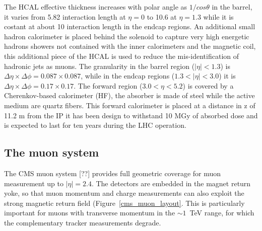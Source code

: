 The HCAL effective thickness increases with polar angle as $1/cos\theta$ in the barrel, 
it varies from 5.82 interaction length at $\eta = 0$ to 10.6 at $\eta = 1.3$ while it is
costant at about 10 interaction length in the endcap regions.
An additional  small hadron
calorimeter is placed behind the solenoid to capture very high energetic hadrons showers not
contained with the inner calorimeters and the magnetic coil, this additional piece of the HCAL
is used to reduce the mis-identification of hadronic jets as muons. The
granularity in the barrel region ($|\eta|<1.3$) is $\Delta\eta × \Delta\phi = 0.087 \times 0.087$, while
in the endcap regions ($1.3<|\eta|<3.0$) it is
$\Delta\eta × \Delta\phi = 0.17 \times 0.17$. The forward region ($3.0 < \eta < 5.2$)
is covered by a Cherenkov-based calorimeter (HF), the absorber is made of steel while the
active medium are quartz fibers.
This forward calorimeter is placed at a distance in z of 11.2 m from the IP it has been design
to withstand 10 MGy of absorbed dose and is expected to last for ten years during the LHC operation.

\subsection{The muon system}
The CMS muon system [??] provides full geometric coverage for muon measurement up to $|\eta| = 2.4$.
The detectors are embedded in the magnet return yoke, so that muon momentum and charge
measurements can also exploit the strong magnetic return field (Figure~\ref{cms_muon_layout}.
This is particularly important
for muons with transverse momentum in the $\sim 1$~TeV range, for which the complementary tracker
measurements degrade.

